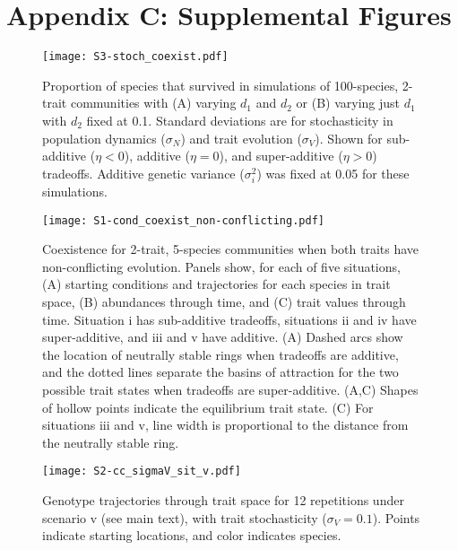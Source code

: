 \section*{Appendix C: Supplemental Figures}

\renewcommand{\thefigure}{C\arabic{figure}}
\renewcommand{\theequation}{C\arabic{equation}}
\renewcommand{\thetable}{C\arabic{table}}
\setcounter{equation}{0}
\setcounter{figure}{0}
\setcounter{table}{0}


\begin{figure}[ht!]
\centering
\texttt{[image: S3-stoch\_coexist.pdf]}
\caption{Proportion of species that survived in simulations of 100-species, 2-trait
    communities with
    (A) varying $d_1$ and $d_2$ or 
    (B) varying just $d_1$ with $d_2$ fixed at 0.1.
    Standard deviations are for stochasticity in
    population dynamics ($\sigma_N$) and
    trait evolution ($\sigma_V$).
    Shown for sub-additive ($\eta < 0$), additive ($\eta = 0$), and 
    super-additive ($\eta > 0$) tradeoffs.
    Additive genetic variance ($\sigma_i^2$) was fixed at 0.05 for 
    these simulations.}
\label{fig:stoch-coexist-nspp}
\end{figure}



\begin{figure}[ht!]
\centering
\texttt{[image: S1-cond\_coexist\_non-conflicting.pdf]}
\caption{Coexistence for 2-trait, 5-species communities when
    both traits have non-conflicting evolution.
    Panels show, for each of five situations,
    (A) starting conditions and trajectories for each species in trait space, 
    (B) abundances through time, and 
    (C) trait values through time.
    Situation i has sub-additive tradeoffs, situations ii and iv have 
    super-additive, and iii and v have additive.
    (A) Dashed arcs show the location of neutrally stable rings
    when tradeoffs are additive, and 
    the dotted lines separate the basins of attraction for the two possible
    trait states when tradeoffs are super-additive.
    (A,C) Shapes of hollow points indicate the equilibrium trait state.
    (C) For situations iii and v, line width is proportional to the 
    distance from the neutrally stable ring.}
\label{fig:cond-coexist-non-conflicting}
\end{figure}


\begin{figure}[ht!]
\centering
\texttt{[image: S2-cc\_sigmaV\_sit\_v.pdf]}
\caption{Genotype trajectories through trait space for 12 repetitions under 
scenario v (see main text), with trait stochasticity ($\sigma_V = 0.1$).
Points indicate starting locations, and color indicates species.}
\label{fig:cond-coexist-Vstoch-sit-v}
\end{figure}



